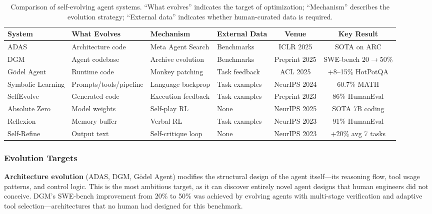 \begin{table}[t]
\centering
\caption{Comparison of self-evolving agent systems. ``What evolves'' indicates the target of optimization; ``Mechanism'' describes the evolution strategy; ``External data'' indicates whether human-curated data is required.}
\label{tab:agent-evo-comparison}
\small
\begin{tabular}{@{}llllcc@{}}
\toprule
\textbf{System} & \textbf{What Evolves} & \textbf{Mechanism} & \textbf{External Data} & \textbf{Venue} & \textbf{Key Result} \\
\midrule
ADAS & Architecture code & Meta Agent Search & Benchmarks & ICLR 2025 & SOTA on ARC \\
DGM & Agent codebase & Archive evolution & Benchmarks & Preprint 2025 & SWE-bench 20$\rightarrow$50\% \\
G\"odel Agent & Runtime code & Monkey patching & Task feedback & ACL 2025 & +8--15\% HotPotQA \\
Symbolic Learning & Prompts/tools/pipeline & Language backprop & Task examples & NeurIPS 2024 & 60.7\% MATH \\
SelfEvolve & Generated code & Execution feedback & Task examples & Preprint 2023 & 86\% HumanEval \\
Absolute Zero & Model weights & Self-play RL & None & NeurIPS 2025 & SOTA 7B coding \\
Reflexion & Memory buffer & Verbal RL & Task examples & NeurIPS 2023 & 91\% HumanEval \\
Self-Refine & Output text & Self-critique loop & None & NeurIPS 2023 & +20\% avg 7 tasks \\
\bottomrule
\end{tabular}
\end{table}

\subsubsection{Evolution Targets}

\textbf{Architecture evolution} (ADAS, DGM, G\"odel Agent) modifies the structural design of the agent itself---its reasoning flow, tool usage patterns, and control logic. This is the most ambitious target, as it can discover entirely novel agent designs that human engineers did not conceive. DGM's SWE-bench improvement from 20\% to 50\% was achieved by evolving agents with multi-stage verification and adaptive tool selection---architectures that no human had designed for this benchmark.

